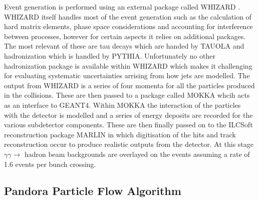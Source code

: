Event generation is performed using an external package called WHIZARD \cite{Kilian:2007gr}. WHIZARD itself handles most of the event generation such as the calculation of hard matrix elements, phase space considerations and accounting for interference between processes, however for certain aspects it relies on additional packages. The most relevant of these are tau decays which are handed by TAUOLA\cite{Jadach:1990mz} and hadronization which is handled by PYTHIA\cite{Sjostrand:2006za}. Unfortunately no other hadronization package is available within WHIZARD which makes it challenging for evaluating systematic uncertainties arrising from how jets are modelled. The output from WHIZARD is a series of four momenta for all the particles produced in the collisions. These are then passed to a package called MOKKA whcih acts as an interface to GEANT4\cite{MoradeFreitas:2002kj}. Within MOKKA the interaction of the particles with the detector is modelled and a series of energy deposits are recorded for the various subdetector components. These are then finally passed on to the ILCSoft reconstruction package MARLIN in which digitisation of the hits and track reconstruction occur to produce realistic outputs from the detector. At this stage $\gamma\gamma\rightarrow$ hadron beam backgrounds are overlayed on the events assuming a rate of 1.6 events per bunch crossing.


\subsection{Pandora Particle Flow Algorithm}
\label{Pandora}

